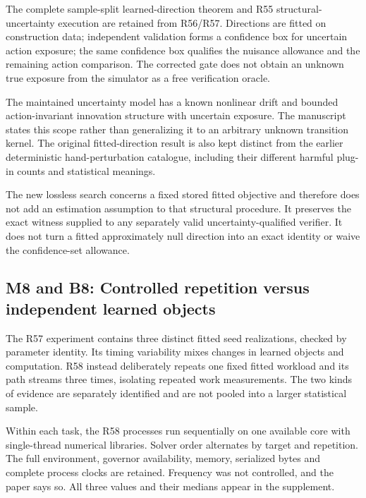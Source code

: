The complete sample-split learned-direction theorem and R55
structural-uncertainty execution are retained from R56/R57. Directions
are fitted on construction data; independent validation forms a
confidence box for uncertain action exposure; the same confidence box
qualifies the nuisance allowance and the remaining action comparison.
The corrected gate does not obtain an unknown true exposure from the
simulator as a free verification oracle.

The maintained uncertainty model has a known nonlinear drift and bounded
action-invariant innovation structure with uncertain exposure. The
manuscript states this scope rather than generalizing it to an arbitrary
unknown transition kernel. The original fitted-direction result is also
kept distinct from the earlier deterministic hand-perturbation
catalogue, including their different harmful plug-in counts and
statistical meanings.

The new lossless search concerns a fixed stored fitted objective and
therefore does not add an estimation assumption to that structural
procedure. It preserves the exact witness supplied to any separately
valid uncertainty-qualified verifier. It does not turn a fitted
approximately null direction into an exact identity or waive the
confidence-set allowance.

\hypertarget{m8-and-b8-controlled-repetition-versus-independent-learned-objects}{%
\subsection{M8 and B8: Controlled repetition versus independent learned
objects}\label{m8-and-b8-controlled-repetition-versus-independent-learned-objects}}

The R57 experiment contains three distinct fitted seed realizations,
checked by parameter identity. Its timing variability mixes changes in
learned objects and computation. R58 instead deliberately repeats one
fixed fitted workload and its path streams three times, isolating
repeated work measurements. The two kinds of evidence are separately
identified and are not pooled into a larger statistical sample.

Within each task, the R58 processes run sequentially on one available
core with single-thread numerical libraries. Solver order alternates by
target and repetition. The full environment, governor availability,
memory, serialized bytes and complete process clocks are retained.
Frequency was not controlled, and the paper says so. All three values
and their medians appear in the supplement.


